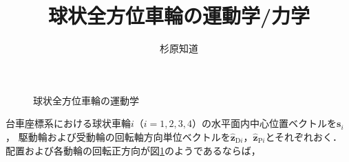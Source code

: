 ﻿\documentclass[a4paper]{jsarticle}
\title{\bf {\LARGE 球状全方位車輪の運動学/力学}}
\author{杉原知道}
\begin{document}

\begin{figure}[h]
\begin{center}

\label{fig:omniball_kinematics}
\caption{球状全方位車輪の運動学}
\end{center}
\end{figure}

台車座標系における球状車輪$i$（$i=1,2,3,4$）の水平面内中心位置ベクトルを$\bm{s}_{i}$，
駆動輪および受動輪の回転軸方向単位ベクトルを$\hat{\bm{z}}_{\mathrm{D}i}$，$\hat{\bm{z}}_{\mathrm{P}i}$とそれぞれおく．
配置および各動輪の回転正方向が図\ref{fig:omniball_kinematics}のようであるならば，
\end{document}
